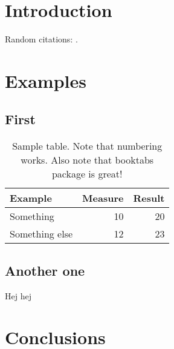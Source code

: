 
\begin{abstract}
\lipsum[1]
\end{abstract}

\section{Introduction}
\lipsum[10]
Random citations: \cite{Kuchlin2000, Sinz2003}.

\section{Examples}
\lipsum[3]

\subsection{First}
\lipsum
\begin{table}
\centering
\caption{Sample table. Note that numbering works. Also note that booktabs package is great!}
\begin{tabular}{l r r}
\toprule
Example & Measure & Result \\
\midrule
Something & 10 & 20 \\
Something else & 12 & 23 \\
\bottomrule
\end{tabular}
\end{table}

\subsection{Another one}
\lipsum[10]
Hej hej
\cite{alexandersson_analysis_2021}

\section{Conclusions}
